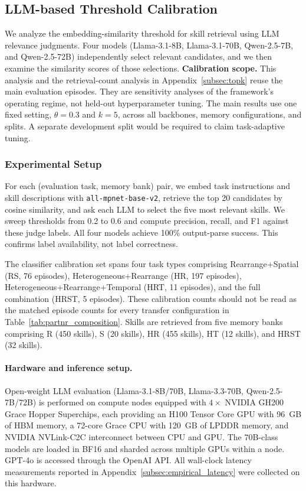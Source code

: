 \documentclass{article}
\theoremstyle{plain}
\theoremstyle{definition}
\theoremstyle{remark}
\begin{document}
\subsection{LLM-based Threshold Calibration}
\label{sec:threshold_calibration}

We analyze the embedding-similarity threshold for skill retrieval using LLM relevance judgments. Four models (Llama-3.1-8B, Llama-3.1-70B, Qwen-2.5-7B, and Qwen-2.5-72B) independently select relevant candidates, and we then examine the similarity scores of those selections. \textbf{Calibration scope.} This analysis and the retrieval-count analysis in Appendix~\ref{subsec:topk} reuse the main evaluation episodes. They are sensitivity analyses of the framework's operating regime, not held-out hyperparameter tuning. The main results use one fixed setting, $\theta=0.3$ and $k=5$, across all backbones, memory configurations, and splits. A separate development split would be required to claim task-adaptive tuning.

\subsubsection{Experimental Setup}
\label{subsec:threshold_setup}

For each (evaluation task, memory bank) pair, we embed task instructions and skill descriptions with \texttt{all-mpnet-base-v2}, retrieve the top 20 candidates by cosine similarity, and ask each LLM to select the five most relevant skills. We sweep thresholds from 0.2 to 0.6 and compute precision, recall, and F1 against these judge labels. All four models achieve 100\% output-parse success. This confirms label availability, not label correctness.

The classifier calibration set spans four task types comprising Rearrange+Spatial (RS, 76 episodes), Heterogeneous+Rearrange (HR, 197 episodes), Heterogeneous+Rearrange+Temporal (HRT, 11 episodes), and the full combination (HRST, 5 episodes). These calibration counts should not be read as the matched episode counts for every transfer configuration in Table~\ref{tab:partnr_composition}. Skills are retrieved from five memory banks comprising R (450 skills), S (20 skills), HR (455 skills), HT (12 skills), and HRST (32 skills).

\paragraph{Hardware and inference setup.} Open-weight LLM evaluation (Llama-3.1-8B/70B, Llama-3.3-70B, Qwen-2.5-7B/72B) is performed on compute nodes equipped with $4\times$ NVIDIA GH200 Grace Hopper Superchips, each providing an H100 Tensor Core GPU with 96~GB of HBM memory, a 72-core Grace CPU with 120~GB of LPDDR memory, and NVIDIA NVLink-C2C interconnect between CPU and GPU. The 70B-class models are loaded in BF16 and sharded across multiple GPUs within a node. GPT-4o is accessed through the OpenAI API. All wall-clock latency measurements reported in Appendix~\ref{subsec:empirical_latency} were collected on this hardware.
\end{document}
